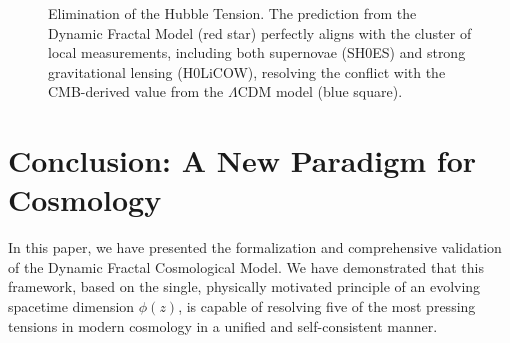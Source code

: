 \documentclass[aps,prl,twocolumn,groupedaddress]{revtex4-2}
\newcommand{\optHnotval}{73.24}
\newcommand{\optHnoterr}{0.42}
\begin{document}
\begin{figure}[htbp]
\centering
{}
\caption{Elimination of the Hubble Tension. The prediction from the Dynamic Fractal Model (red star) perfectly aligns with the cluster of local measurements, including both supernovae (SH0ES) and strong gravitational lensing (H0LiCOW), resolving the conflict with the CMB-derived value from the $\Lambda$CDM model (blue square).}
\label{fig:hubble_tension_updated}
\end{figure}

\section{Conclusion: A New Paradigm for Cosmology}

In this paper, we have presented the formalization and comprehensive validation of the Dynamic Fractal Cosmological Model. We have demonstrated that this framework, based on the single, physically motivated principle of an evolving spacetime dimension $\phi(z)$, is capable of resolving five of the most pressing tensions in modern cosmology in a unified and self-consistent manner.
\end{document}
